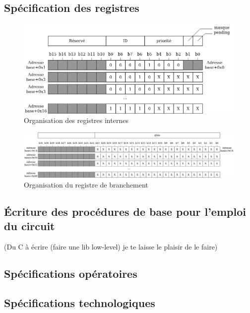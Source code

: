 
\subsection{Spécification des registres}

\begin{figure}[H]
	\centering
	\includegraphics[width=1\linewidth]{figure/plan_registres.png}
	\caption{Organisation des registres internes}
	\label{fig:plan_registres}
\end{figure} 

\begin{figure}[H]
	\centering
	\includegraphics[width=1\linewidth]{figure/plan_branchement.png}
	\caption{Organisation du registre de branchement}
	\label{fig:plan_branchement}
\end{figure} 

\subsection{Écriture des procédures de base pour l'emploi du circuit}

(Du C à écrire (faire une lib low-level) je te laisse le plaisir de le faire)\\

\subsection{Spécifications opératoires}
\subsection{Spécifications technologiques}